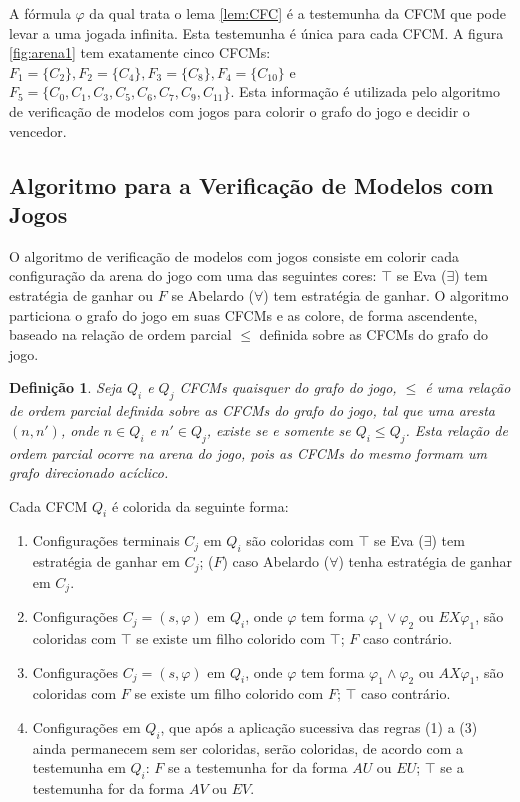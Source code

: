 \documentclass[normaltoc,capchap,capsec,times]{abnt}
\newtheorem{defi}{Definição}[section]
\begin{document}
A fórmula $\varphi$ da qual trata o lema \ref{lem:CFC} é a testemunha da CFCM que pode levar a uma jogada infinita. Esta testemunha é única para cada CFCM. A figura \ref{fig:arena1} tem exatamente cinco CFCMs: $F_1=\{C_2\}, F_2=\{C_4\}, F_3=\{C_8\}, F_4=\{C_10\}$ e $F_5 = \{ C_0, C_1, C_3, C_5, C_6, C_7,C_9, C_{11}\}$. Esta informação é utilizada pelo algoritmo de verificação de modelos com jogos para colorir o grafo do jogo e decidir o vencedor.

\subsection{Algoritmo para a Verificação de Modelos com Jogos}\label{sec:alg2valores}

O algoritmo de verificação de modelos com jogos consiste em colorir cada configuração da arena do jogo com uma das seguintes cores: $\top$ se Eva ($\exists$) tem estratégia de ganhar ou $F$ se Abelardo ($\forall$) tem estratégia de ganhar. O algoritmo particiona o grafo do jogo em suas CFCMs e as colore, de forma ascendente, baseado na relação de ordem parcial $\leq$ definida sobre as CFCMs do grafo do jogo. 

\begin{defi}\label{def:leq}
\textnormal {
\cite{grumbergalg} Seja $Q_i$ e $Q_j$ CFCMs quaisquer do grafo do jogo, $\leq$ é uma relação de ordem parcial definida sobre as CFCMs do grafo do jogo, tal que uma aresta $(n,n')$, onde $n \in Q_i$ e $n' \in Q_j$, existe se e somente se $Q_i \leq Q_j$. Esta relação de ordem parcial ocorre na arena do jogo, pois as CFCMs do mesmo formam um grafo direcionado acíclico.
}
\end{defi}

Cada CFCM $Q_i$ é colorida da seguinte forma:

\begin{enumerate}[label=(\arabic*),noitemsep]
	\item Configurações terminais $C_j$ em $Q_i$ são coloridas com $\top$ se Eva ($\exists$) tem estratégia de ganhar em $C_j$; ($F$) caso Abelardo ($\forall$) tenha estratégia de ganhar em $C_j$.
	\item Configurações $C_j=(s,\varphi)$ em $Q_i$, onde $\varphi$ tem forma $\varphi_1 \vee \varphi_2$ ou $EX \varphi_1$, são coloridas com $\top$ se existe um filho colorido com $\top$; $F$ caso contrário.
	\item Configurações $C_j=(s,\varphi)$ em $Q_i$, onde $\varphi$ tem forma $\varphi_1 \wedge \varphi_2$ ou $AX \varphi_1$, são coloridas com $F$ se existe um filho colorido com $F$; $\top$ caso contrário.
	\item Configurações  em $Q_i$, que após a aplicação sucessiva das regras (1) a (3) ainda permanecem sem ser coloridas, serão coloridas, de acordo com a testemunha em $Q_i$: $F$ se a testemunha for da forma $AU$ ou $EU$; $\top$ se a testemunha for da forma $AV$ ou $EV$. 
\end{enumerate}
\end{document}
